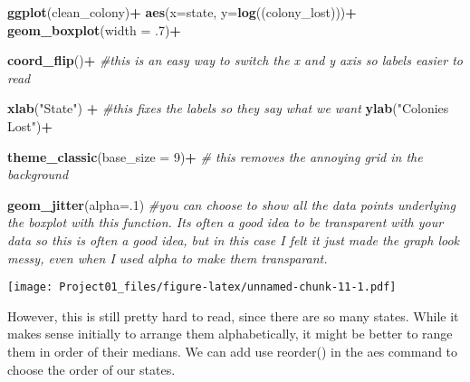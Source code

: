 \documentclass[
]{article}
\newenvironment{Shaded}{\begin{snugshade}}{\end{snugshade}}
\newcommand{\AttributeTok}[1]{\textcolor[rgb]{0.13,0.29,0.53}{#1}}
\newcommand{\CommentTok}[1]{\textcolor[rgb]{0.56,0.35,0.01}{\textit{#1}}}
\newcommand{\DecValTok}[1]{\textcolor[rgb]{0.00,0.00,0.81}{#1}}
\newcommand{\FunctionTok}[1]{\textcolor[rgb]{0.13,0.29,0.53}{\textbf{#1}}}
\newcommand{\NormalTok}[1]{#1}
\newcommand{\SpecialCharTok}[1]{\textcolor[rgb]{0.81,0.36,0.00}{\textbf{#1}}}
\newcommand{\StringTok}[1]{\textcolor[rgb]{0.31,0.60,0.02}{#1}}
\begin{document}
\begin{Shaded}
\begin{Highlighting}[]
\FunctionTok{ggplot}\NormalTok{(clean\_colony)}\SpecialCharTok{+}  
  \FunctionTok{aes}\NormalTok{(}\AttributeTok{x=}\NormalTok{state, }\AttributeTok{y=}\FunctionTok{log}\NormalTok{((colony\_lost)))}\SpecialCharTok{+}
  \FunctionTok{geom\_boxplot}\NormalTok{(}\AttributeTok{width =}\NormalTok{ .}\DecValTok{7}\NormalTok{)}\SpecialCharTok{+}
  
  
  
  \FunctionTok{coord\_flip}\NormalTok{()}\SpecialCharTok{+} \CommentTok{\#this is an easy way to switch the x and y axis so labels easier to read}
  
  
  \FunctionTok{xlab}\NormalTok{(}\StringTok{"State"}\NormalTok{) }\SpecialCharTok{+} \CommentTok{\#this fixes the labels so they say what we want}
  \FunctionTok{ylab}\NormalTok{(}\StringTok{"Colonies Lost"}\NormalTok{)}\SpecialCharTok{+}
  
  
  
  \FunctionTok{theme\_classic}\NormalTok{(}\AttributeTok{base\_size =} \DecValTok{9}\NormalTok{)}\SpecialCharTok{+} \CommentTok{\# this removes the annoying grid in the background}
  
  
  
  \FunctionTok{geom\_jitter}\NormalTok{(}\AttributeTok{alpha=}\NormalTok{.}\DecValTok{1}\NormalTok{) }\CommentTok{\#you can choose to show all the data points underlying the boxplot with this function. It\textquotesingle{}s often a good idea to be transparent with your data so this is often a good idea, but in this case I felt it just made the graph look messy, even when I used alpha to make them transparant. }
\end{Highlighting}
\end{Shaded}

\texttt{[image: Project01\_files/figure-latex/unnamed-chunk-11-1.pdf]}

However, this is still pretty hard to read, since there are so many
states. While it makes sense initially to arrange them alphabetically,
it might be better to range them in order of their medians. We can add
use reorder() in the aes command to choose the order of our states.
\end{document}
